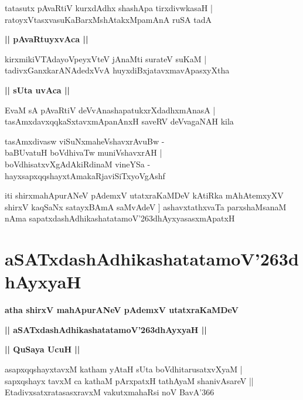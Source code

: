 \documentclass[twoside,12pt,openright]{book}
\def\S{\char'263}
\newcounter{shloka}[chapter]
\def\uvaca#1{\centerline{{\large\textbf{#1}}}}
\begin{document}
\begin{shloka}%
tatasutx pAvaRtiV kurxdAdhx shashApa tirxdivwkasaH |\\
ratoyxVtasxvasuKaBarxMshAtakxMpamAnA ruSA tadA 
\end{shloka}

\uvaca{|| pAvaRtuyxvAca ||}

\begin{shloka}%
kirxmikiVTAdayoVpeyxVteV jAnaMti surateV suKaM |\\
tadivxGanxkarANAdedxVvA huyxdiBxjatavxmavApasxyXtha 
\end{shloka}

\uvaca{|| sUta uvAca ||}

\begin{shloka}%
EvaM sA pAvaRtiV deVvAnashapatukxrXdadhxmAnasA |\\
tasAmxdavxqqkaSxtavxmApanAnxH saveRV deVvagaNAH kila
\end{shloka}

\begin{shloka}%
tasAmxdivasw viSuNxmaheVshavxrAvuBw -\\
baBUvatuH boVdhivaTw muniVshavxrAH |\\
boVdhisatxvXgAdAkiRdinaM vineYSa - \\
hayxsapxqqshayxtAmakaRjaviSiTxyoVgAshf
\end{shloka}

\begin{center}
iti shirxmahApurANeV pAdemxV utatxraKaMDeV kAtiRka mAhAtemxyXV shirxV kaqSaNx satayxBAmA saMvAdeV ]
ashavxtathxvaTa parxshaMsanaM nAma sapatxdashAdhikashatatamoV\S dhAyxyasasxmApatxH 
\end{center}

\chapter{aSATxdashAdhikashatatamoV\S dhAyxyaH}

\begin{center}
{\LARGE\bfseries atha shirxV mahApurANeV pAdemxV utatxraKaMDeV}
\end{center}

\begin{center}
{\LARGE\bfseries || aSATxdashAdhikashatatamoV\S dhAyxyaH || }
\end{center}

\uvaca{|| QuSaya UcuH ||}

\begin{shloka}%
asapxqqshayxtavxM katham yAtaH sUta boVdhitarusatxvXyaM |\\
sapxqshayx tavxM ca kathaM pArxpatxH tathAyaM shanivAsareV ||\\
EtadivxsatxratasasxravxM vakutxmahaRsi noV BavA\char'366
\end{shloka}
\end{document}
